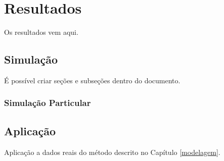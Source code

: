 \chapter{Resultados}\label{resultados}

Os resultados vem aqui.

\section{Simulação}\label{resultadosSimulacao}

É possível criar seções e subseções dentro do documento.


\subsection{Simulação Particular}\label{resultadosSimulacao_sub}



\section{Aplicação}\label{aplicacao}

Aplicação a dados reais do método descrito no Capítulo \ref{modelagem}.

